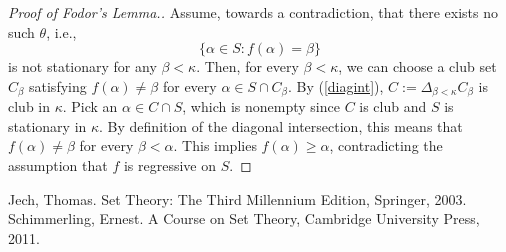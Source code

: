 \documentclass[11pt]{article}
\theoremstyle{definition}
\begin{document}
\begin{proof}[Proof of Fodor's Lemma.]
    Assume, towards a contradiction, that there exists no such $\theta$, i.e., $$\{\alpha\in S: f(\alpha)
    =\beta\}$$ is not stationary for any $\beta<\kappa$. Then, for every $\beta<\kappa$, we can choose a
    club set $C_\beta$ satisfying $f(\alpha)\neq\beta$ for every $\alpha\in S\cap C_\beta$. By (\ref{diagint}),
    $C:=\Delta_{\beta<\kappa}C_{\beta}$ is club in $\kappa$. Pick an $\alpha\in C\cap S$, which is nonempty
    since $C$ is club and $S$ is stationary in $\kappa$. By definition of the diagonal intersection, this
    means that $f(\alpha)\neq\beta$ for every $\beta < \alpha$. This implies $f(\alpha)\geq\alpha$,
    contradicting the assumption that $f$ is regressive on $S$.
\end{proof}

\begin{thebibliography}{}
     Jech, Thomas. Set Theory: The Third Millennium Edition, Springer, 2003.
     Schimmerling, Ernest. A Course on Set Theory, Cambridge University Press, 2011.
\end{thebibliography}
\end{document}
